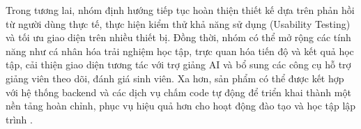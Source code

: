 \documentclass[12pt,a4paper,oneside]{report}
\begin{document}
Trong tương lai, nhóm định hướng tiếp tục hoàn thiện thiết kế dựa trên phản hồi từ người dùng thực tế, thực hiện kiểm thử khả năng sử dụng (Usability Testing) và tối ưu giao diện trên nhiều thiết bị. Đồng thời, nhóm có thể mở rộng các tính năng như cá nhân hóa trải nghiệm học tập, trực quan hóa tiến độ và kết quả học tập, cải thiện giao diện tương tác với trợ giảng AI và bổ sung các công cụ hỗ trợ giảng viên theo dõi, đánh giá sinh viên. Xa hơn, sản phẩm có thể được kết hợp với hệ thống backend và các dịch vụ chấm code tự động để triển khai thành một nền tảng hoàn chỉnh, phục vụ hiệu quả hơn cho hoạt động đào tạo và học tập lập trình \cite{iso9241, nielsen1994, wcag22, combefis2022automated, messer2024automated, kuo2023study}.

\newpage

\end{document}

